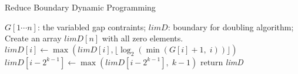 \begin{algorithm}[!thb]
  \caption{Reduce Boundary Dynamic Programming}
  \label{alg:reduce-boundary}
  \begin{algorithmic}[1]
  \Require
      $G[1 \cdots n]$: the variabled gap contraints;
  \Ensure
      $\textit{limD}$: boundary for doubling algorithm;
  \State Create an array $\textit{limD}[n]$ with all zero elements.
    \State $\textit{limD}[i] \gets \max(\textit{limD}[i], \lfloor \log_2(\min(G[i]+1, \; i)) \rfloor)$
      \State $\textit{limD}[i-2^{k-1}] \gets \max(\textit{limD}[i-2^{k-1}], \; k-1)$
    \EndFor
  \EndFor
  \State return \textit{limD}
  \end{algorithmic}
\end{algorithm}